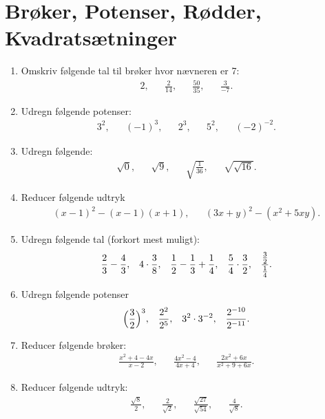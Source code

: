 \section{ Brøker, Potenser, Rødder, Kvadratsætninger}

\begin{enumerate}
\item Omskriv følgende tal til brøker hvor nævneren er 7:
\begin{align*}
2,&& \frac{2}{14},&&  \frac{50}{35},&& \frac{3}{-7}.%
\end{align*}

\item Udregn følgende potenser:
\begin{align*}
3^2,&& (-1)^{3},&& 2^3,&& 5^2,&& (-2)^{-2}.
\end{align*}

\item Udregn følgende:
\begin{align*}
\sqrt{0},&& \sqrt{9},&& \sqrt{\frac{1}{36}},&& \sqrt{\sqrt{16}}.
\end{align*}
\item Reducer følgende udtryk
\begin{align*}
(x-1)^2-(x-1)(x+1),&& (3x+y)^2-(x^2+5xy).
\end{align*}

\item Udregn følgende tal (forkort mest muligt):
\begin{align*}
\frac{2}{3}-\frac{4}{3},&&4\cdot\frac{3}{8},&& \frac{1}{2}-\frac{1}{3}+\frac{1}{4},&& \frac{5}{4}\cdot \frac{3}{2},&& \frac{\frac{3}{2}}{\frac{1}{4}}.
\end{align*}

\item Udregn følgende potenser
\begin{align*}
\Big(\frac{3}{2}\Big)^3,&& \frac{2^2}{2^5},&& 3^2\cdot 3^{-2},&& \frac{2^{-10}}{2^{-11}}.
\end{align*}

\item Reducer følgende brøker:
\begin{align*}
\frac{x^2+4-4x}{x-2},&& \frac{4x^2-4}{4x+4},&&\frac{2x^2+6x}{x^2+9+6x}.
\end{align*}

\item Reducer følgende udtryk:
\begin{align*}
\frac{\sqrt{8}}{2},&& \frac{2}{\sqrt{2}},&& \frac{\sqrt{27}}{\sqrt{54}},&& \frac{4}{\sqrt{8}}.
\end{align*}


\end{enumerate}
